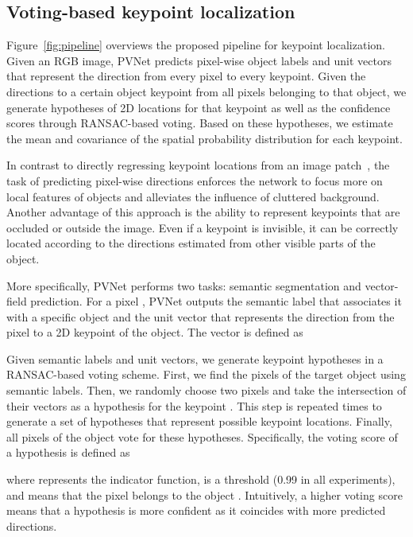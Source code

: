 \documentclass[10pt,twocolumn,letterpaper]{article}
\begin{document}
\subsection{Voting-based keypoint localization}
\label{sec:pvnet}



Figure~\ref{fig:pipeline} overviews the proposed pipeline for keypoint localization. Given an RGB image, PVNet predicts pixel-wise object labels and unit vectors that represent the direction from every pixel to every keypoint. Given the directions to a certain object keypoint from all pixels belonging to that object, we generate hypotheses of 2D locations for that keypoint as well as the confidence scores through RANSAC-based voting. Based on these hypotheses, we estimate the mean and covariance of the spatial probability distribution for each keypoint.

In contrast to directly regressing keypoint locations from an image patch~\cite{rad2017bb8, tekin2018real}, the task of predicting pixel-wise directions enforces the network to focus more on local features of objects and alleviates the influence of cluttered background. Another advantage of this approach is the ability to represent keypoints that are occluded or outside the image. Even if a keypoint is invisible, it can be correctly located according to the directions estimated from other visible parts of the object.







More specifically, PVNet performs two tasks: semantic segmentation and vector-field prediction. For a pixel , PVNet outputs the semantic label that associates it with a specific object and the unit vector  that represents the direction from the pixel  to a 2D keypoint  of the object. The vector  is defined as





Given semantic labels and unit vectors, we generate keypoint hypotheses in a RANSAC-based voting scheme. First, we find the pixels of the target object using semantic labels. Then, we randomly choose two pixels and take the intersection of their vectors as a hypothesis  for the keypoint . This step is repeated  times to generate a set of hypotheses  that represent possible keypoint locations. Finally, all pixels of the object vote for these hypotheses. Specifically, the voting score  of a hypothesis  is defined as


where  represents the indicator function,  is a threshold (0.99 in all experiments), and  means that the pixel  belongs to the object . Intuitively, a higher voting score means that a hypothesis is more confident as it coincides with more predicted directions.
\end{document}
